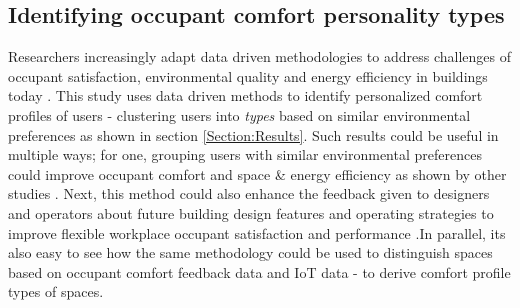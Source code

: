 \documentclass[]{interact}
\theoremstyle{plain}%
\theoremstyle{definition}
\theoremstyle{remark}
\begin{document}


\subsection{Identifying occupant comfort personality types}
Researchers increasingly adapt data driven methodologies to address challenges of occupant satisfaction, environmental quality and energy efficiency in buildings today \citep{Textmining, occupantcomplaints, IEQandsatisfaction}. This study uses data driven methods to identify personalized comfort profiles of users - clustering users into \emph{types} based on similar environmental preferences as shown in section \ref{Section:Results}. Such results could be useful in multiple ways; for one, grouping users with similar environmental preferences could improve occupant comfort and space \& energy efficiency as shown by other studies \citep{KAMARULZAMAN2011262}. Next, this method could also enhance the feedback given to designers and operators about future building design features and operating strategies to improve flexible workplace occupant satisfaction and performance \citep{KWON2019356}.In parallel, its also easy to see how the same methodology could be used to distinguish spaces based on occupant comfort feedback data and IoT data - to derive comfort profile types of spaces.

\end{document}
